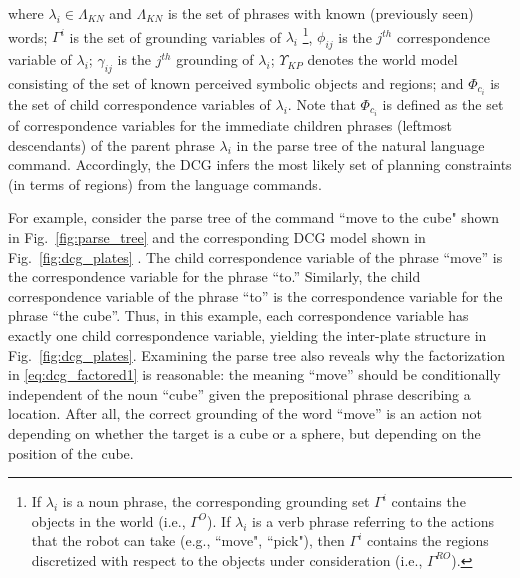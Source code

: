 where $\lambda_i \in \Lambda_{KN}$ and $\Lambda_{KN}$ is the set of phrases with known (previously seen) words; $\Gamma^i$ is the set of grounding variables of $\lambda_i$ \footnote{If $\lambda_i$ is a noun phrase, the corresponding grounding set $\Gamma^i$ contains the objects in the world (i.e., $\Gamma^O$). If $\lambda_i$ is a verb phrase referring to the actions that the robot can take (e.g., ``move", ``pick"), then $\Gamma^i$ contains the regions discretized with respect to the objects under consideration (i.e., $\Gamma^{RO}$).}, $\phi_{ij}$ is the $j^{th}$ correspondence variable of $\lambda_i$; $\gamma_{ij}$ is the $j^{th}$ grounding of $\lambda_i$; $\Upsilon_{KP}$ denotes the world model consisting of the set of known perceived symbolic objects and regions; and  $\Phi_{c_{i}}$ is the set of child correspondence variables of $\lambda_{i}$. Note that $\Phi_{c_{i}}$ is defined as the set of correspondence variables for the immediate children phrases (leftmost descendants) of the parent phrase $\lambda_i$ in the parse tree of the natural language command. Accordingly, the DCG infers the most likely set of planning constraints (in terms of regions) from the language commands.

For example, consider the parse tree of the command ``move to the cube" shown in Fig.~\ref{fig:parse_tree} and the corresponding DCG model shown in Fig.~\ref{fig:dcg_plates} . The child correspondence variable of the phrase ``move'' is the correspondence variable for the phrase ``to.'' Similarly, the child correspondence variable of the phrase ``to'' is the correspondence variable for the phrase ``the cube''. Thus, in this example, each correspondence variable has exactly one child correspondence variable, yielding the inter-plate structure in Fig.~\ref{fig:dcg_plates}.
Examining the parse tree also reveals why the factorization in \eqref{eq:dcg_factored1} is reasonable: the meaning ``move'' should be conditionally independent of the noun ``cube'' given the prepositional phrase describing a location.
After all, the correct grounding of the word ``move'' is an action not depending on whether the target is a cube or a sphere, but depending on the position of the cube.

